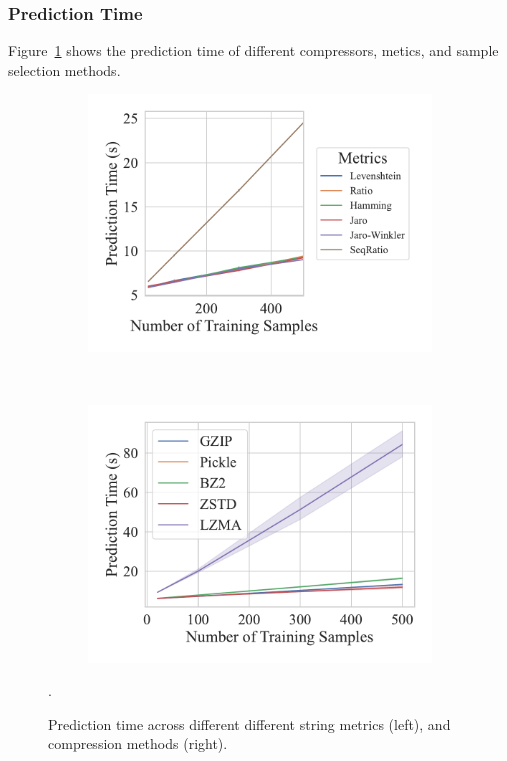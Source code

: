 \subsubsection{Prediction Time}

Figure~\ref{fig:sms_spam_prediction_time} shows the prediction time of different compressors, metics, and sample selection methods.
\begin{figure}[h!]
	\centering
    \captionsetup[subfigure]{skip=0pt}
	\begin{subfigure}[t]{.44\textwidth}
		\centering
		\includegraphics[width=\textwidth]{figs/sms_spam/string_metric_vs_predict_time.pdf}
	\end{subfigure}
	~
	\begin{subfigure}[t]{.44\textwidth}
		\centering
		\includegraphics[width=\textwidth]{figs/sms_spam/compressor_metric_vs_predict_time.pdf}
	\end{subfigure}
	\caption{Prediction time across different different string metrics (left), and compression methods (right).}.
	\label{fig:sms_spam_prediction_time}
 
\end{figure}

